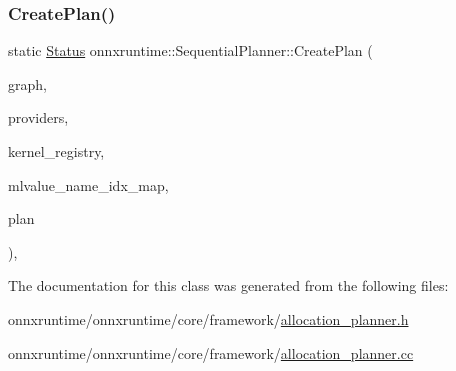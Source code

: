 \subsubsection{\texorpdfstring{Create\+Plan()}{CreatePlan()}\hspace{0.1cm}{\footnotesize\ttfamily [2/2]}}
{\footnotesize\ttfamily static \mbox{\hyperlink{classonnxruntime_1_1common_1_1Status}{Status}} onnxruntime\+::\+Sequential\+Planner\+::\+Create\+Plan (\begin{DoxyParamCaption}\item[{const \mbox{\hyperlink{classonnxruntime_1_1GraphViewer}{onnxruntime\+::\+Graph\+Viewer}} \&}]{graph,  }\item[{const \mbox{\hyperlink{classonnxruntime_1_1ExecutionProviders}{Execution\+Providers}} \&}]{providers,  }\item[{const \mbox{\hyperlink{classonnxruntime_1_1KernelRegistryManager}{Kernel\+Registry\+Manager}} \&}]{kernel\+\_\+registry,  }\item[{const \mbox{\hyperlink{classonnxruntime_1_1MLValueNameIdxMap}{M\+L\+Value\+Name\+Idx\+Map}} \&}]{mlvalue\+\_\+name\+\_\+idx\+\_\+map,  }\item[{std\+::unique\+\_\+ptr$<$ \mbox{\hyperlink{structonnxruntime_1_1SequentialExecutionPlan}{Sequential\+Execution\+Plan}} $>$ \&}]{plan }\end{DoxyParamCaption})\hspace{0.3cm}{\ttfamily [inline]}, {\ttfamily [static]}}



The documentation for this class was generated from the following files\+:\begin{DoxyCompactItemize}
\item 
onnxruntime/onnxruntime/core/framework/\mbox{\hyperlink{allocation__planner_8h}{allocation\+\_\+planner.\+h}}\item 
onnxruntime/onnxruntime/core/framework/\mbox{\hyperlink{allocation__planner_8cc}{allocation\+\_\+planner.\+cc}}\end{DoxyCompactItemize}
